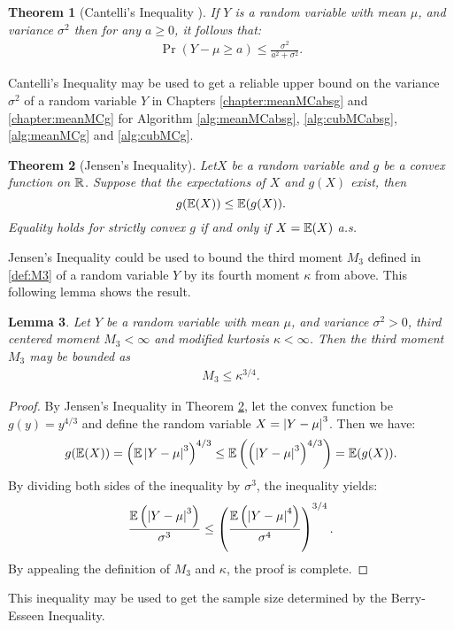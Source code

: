 \documentclass{iitthesis}
\newtheorem{theorem}{Theorem}[section]
\newtheorem{lemma}[theorem]{Lemma}
\theoremstyle{definition}
\begin{document}

\begin{theorem}[Cantelli's Inequality {\cite[6.1.e]{LB10}}]\label{CanThm} If $Y$ is a random variable with mean $\mu$, and variance $\sigma^2$ then for any $a \geq 0$, it follows that: 
\begin{align}
\Pr(Y-\mu \ge a) \le  \frac{\sigma^2}{a^2+\sigma^2}.
\end{align}
\end{theorem}
Cantelli's Inequality may be used to get a reliable upper bound on the variance $\sigma^2$ of a random variable $Y$ in Chapters \ref{chapter:meanMCabsg} and \ref{chapter:meanMCg} for Algorithm \ref{alg:meanMCabsg}, \ref{alg:cubMCabsg}, \ref{alg:meanMCg} and \ref{alg:cubMCg}.


\begin{theorem}[Jensen's Inequality{\cite[8.4a]{LB10}}]\label{Jensen}
Let$X$ be a random variable and $g$ be a convex function on $\mathbb{R}$. Suppose that the expectations of $X$ and $g(X)$ exist, then
$$g(\mathbb{E}(X)) \leq \mathbb{E}(g(X)).$$
Equality holds for strictly convex $g$ if and only if $X=\mathbb{E}(X)$ a.s.
\end{theorem}
Jensen's Inequality could be used to bound the third moment $M_3$ defined in \eqref{def:M3} of a random variable $Y$ by its fourth moment $\kappa$ from above. This following lemma shows the result.
\begin{lemma}\label{M3kappalemma}
Let $Y$ be a random variable with mean $\mu$, and variance $\sigma^2>0$, third centered moment $M_3 < \infty$ and modified kurtosis $\kappa < \infty$. Then the third moment $M_3$ may be bounded as 
\begin{align}\label{M3kappa}
M_3\leq \kappa^{3/4}.
\end{align}
\end{lemma}
\begin{proof}
By Jensen's Inequality in Theorem \ref{Jensen}, let the convex function be $g(y) = y^{4/3}$ and define the random variable $X = \left \lvert Y-\mu \right \rvert^3$. Then we have:
$$g(\mathbb{E}(X)) = \left (\mathbb{E}\left \lvert Y-\mu \right \rvert^3\right)^{4/3} \leq \mathbb{E}\left(\left(\left \lvert Y-\mu \right \rvert^3\right)^{4/3}\right) = \mathbb{E}(g(X)).$$
By dividing both sides of the inequality by $\sigma^3$, the inequality yields:
$$\frac{\mathbb{E}\left(\left \lvert Y-\mu \right \rvert^3\right)}{\sigma^3} \leq \left (\frac{\mathbb{E}\left(\left \lvert Y-\mu \right \rvert^4\right)}{\sigma^4}\right)^{3/4}.$$
By appealing the definition of $M_3$ and $\kappa$, the proof is complete.
\end{proof}
This inequality may be used to get the sample size determined by the Berry-Esseen Inequality.
\end{document}
